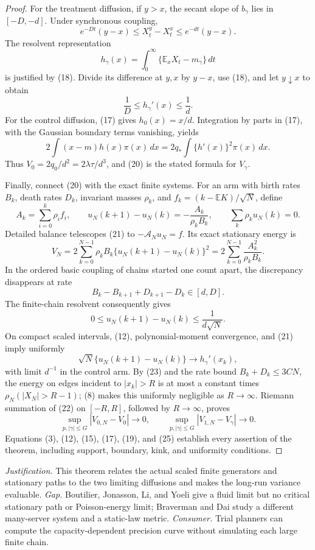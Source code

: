 \documentclass{article}
\begin{document}
\begin{proof}
For the treatment diffusion, if \(y>x\), the secant slope of \(b_\gamma\) lies in \([-D,-d]\).  Under synchronous coupling,
\[
 e^{-Dt}(y-x)\leq X_t^y-X_t^x\leq e^{-dt}(y-x).                \tag{18}
\]
The resolvent representation
\[
 h_\gamma(x)=\int_0^\infty\{\mathbb E_xX_t-m_\gamma\}\,dt
\]
is justified by (18).  Divide its difference at \(y,x\) by \(y-x\), use (18), and let \(y\downarrow x\) to obtain
\[
 \frac1D\leq h_\gamma'(x)\leq\frac1d.                       \tag{19}
\]
For the control diffusion, (17) gives \(h_0(x)=x/d\).  Integration by parts in (17), with the Gaussian boundary terms vanishing, yields
\[
 2\int(x-m)h(x)\pi(x)\,dx
 =2q_*\int\{h'(x)\}^2\pi(x)\,dx.                             \tag{20}
\]
Thus \(V_0=2q_0/d^2=2\lambda\tau/d^3\), and (20) is the stated formula for \(V_\gamma\).

Finally, connect (20) with the exact finite systems.  For an arm with birth rates \(B_k\), death rates \(D_k\), invariant masses \(\rho_k\), and \(f_k=(k-\mathbb EK)/\sqrt N\), define
\[
 A_k=\sum_{i=0}^k\rho_i f_i,
 \qquad
 u_N(k+1)-u_N(k)=-\frac{A_k}{\rho_kB_k},
 \qquad \sum_k\rho_ku_N(k)=0.                                \tag{21}
\]
Detailed balance telescopes (21) to \(-\mathcal A_Nu_N=f\).  Its exact stationary energy is
\[
 V_N=2\sum_{k=0}^{N-1}\rho_kB_k\{u_N(k+1)-u_N(k)\}^2
 =2\sum_{k=0}^{N-1}\frac{A_k^2}{\rho_kB_k}.                   \tag{22}
\]
In the ordered basic coupling of chains started one count apart, the discrepancy disappears at rate
\[
 B_k-B_{k+1}+D_{k+1}-D_k\in[d,D].
\]
The finite-chain resolvent consequently gives
\[
 0\leq u_N(k+1)-u_N(k)\leq\frac1{d\sqrt N}.                   \tag{23}
\]
On compact scaled intervals, (12), polynomial-moment convergence, and (21) imply uniformly
\[
 \sqrt N\{u_N(k+1)-u_N(k)\}\longrightarrow h_\gamma'(x_k),   \tag{24}
\]
with limit \(d^{-1}\) in the control arm.  By (23) and the rate bound \(B_k+D_k\leq3CN\), the energy on edges incident to \(|x_k|>R\) is at most a constant times \(\rho_N(|X_N|>R-1)\); (8) makes this uniformly negligible as \(R\to\infty\).  Riemann summation of (22) on \([-R,R]\), followed by \(R\to\infty\), proves
\[
 \sup_{p,|\gamma|\leq G}|V_{0,N}-V_0|\to0,
 \qquad
 \sup_{p,|\gamma|\leq G}|V_{1,N}-V_\gamma|\to0.             \tag{25}
\]
Equations (3), (12), (15), (17), (19), and (25) establish every assertion of the theorem, including support, boundary, kink, and uniformity conditions.
\end{proof}
\par\smallskip\noindent \textit{Justification.} This theorem relates the actual scaled finite generators and stationary paths to the two limiting diffusions and makes the long-run variance evaluable. \textit{Gap.} Boutilier, Jonasson, Li, and Yoeli give a fluid limit but no critical stationary path or Poisson-energy limit; Braverman and Dai study a different many-server system and a static-law metric. \textit{Consumer.} Trial planners can compute the capacity-dependent precision curve without simulating each large finite chain.
\end{document}

